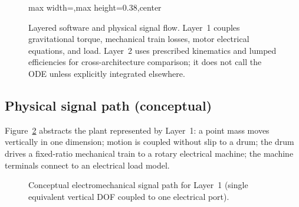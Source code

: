 \documentclass[11pt,a4paper]{article}
\begin{document}
\begin{figure}[htbp]
\begin{adjustbox}{max width=\linewidth,max height=0.38\textheight,center}
\begin{tikzpicture}
\end{tikzpicture}
\end{adjustbox}
\caption{Layered software and physical signal flow. Layer~1 couples gravitational torque, mechanical train losses, motor electrical equations, and load. Layer~2 uses prescribed kinematics and lumped efficiencies for cross-architecture comparison; it does not call the ODE unless explicitly integrated elsewhere.}
\label{fig:dfd}
\end{figure}

\subsection{Physical signal path (conceptual)}

Figure~\ref{fig:physical} abstracts the plant represented by Layer~1: a point mass moves vertically in one dimension; motion is coupled without slip to a drum; the drum drives a fixed-ratio mechanical train to a rotary electrical machine; the machine terminals connect to an electrical load model.

\begin{figure}[htbp]
\centering
{}
\caption{Conceptual electromechanical signal path for Layer~1 (single equivalent vertical DOF coupled to one electrical port).}
\label{fig:physical}
\end{figure}

\end{document}
